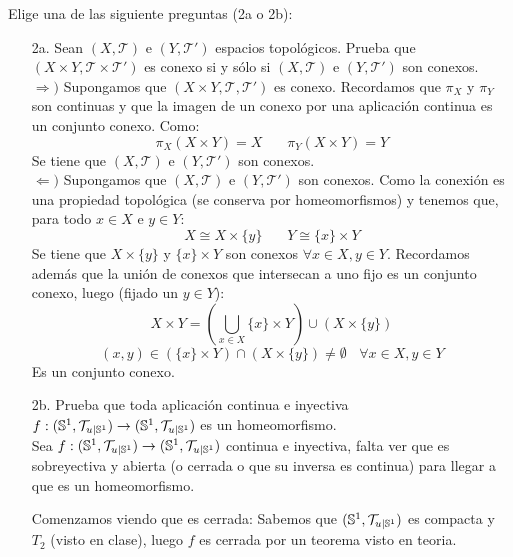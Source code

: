 \documentclass[12pt]{article}
\begin{document}
    \begin{ejercicio}[2.5 puntos]
        Elige una de las siguiente preguntas (2a o 2b):
        \begin{enumerate}
            \item[2a.] Sean $(X, \mathcal{T})$ e $(Y, \mathcal{T}')$ espacios topológicos. Prueba que $(X\times Y, \mathcal{T}\times \mathcal{T}')$ es conexo si y sólo si $(X, \mathcal{T})$ e $(Y, \mathcal{T}')$ son conexos.\\

                \noindent
                $\Rightarrow)$ Supongamos que $(X \times Y, \mathcal{T}, \mathcal{T}')$ es conexo. Recordamos que $\pi_X$ y $\pi_Y$ son continuas y que la imagen de un conexo por una aplicación continua es un conjunto conexo. Como:
                $$\pi_X(X\times Y) = X~~~~~~~~\pi_Y(X \times Y) = Y$$
                Se tiene que $(X, \mathcal{T})$ e $(Y, \mathcal{T}')$ son conexos.\\

                \noindent
                $\Leftarrow)$ Supongamos que $(X, \mathcal{T})$ e $(Y, \mathcal{T}')$ son conexos. Como la conexión es una propiedad topológica (se conserva por homeomorfismos) y tenemos que, para todo $x \in X$ e $y \in Y$:
                $$X \cong X \times \{y\}~~~~~~~~ Y \cong \{x\} \times Y$$
                Se tiene que $X \times \{y\}$ y $\{x\} \times Y$ son conexos $\forall x \in X, y \in Y$.\newline
                Recordamos además que la unión de conexos que intersecan a uno fijo es un conjunto conexo, luego (fijado un $y \in Y$):
                $$X \times Y = \left( \bigcup_{x \in X} \{x\} \times Y\right) \cup (X \times \{y\})$$
                $$ (x,y) \in (\{x\} \times Y) \cap (X \times \{y\}) \neq \emptyset~~~~\forall x \in X, y \in Y$$
                Es un conjunto conexo.
                
            \item[2b.] Prueba que toda aplicación continua e inyectiva $f:(\mathbb{S}^1, \mathcal{T}_{u|\mathbb{S}^1}) \rightarrow (\mathbb{S}^1, \mathcal{T}_{u|\mathbb{S}^1})$ es un homeomorfismo.\\

                \noindent
                Sea $f:(\mathbb{S}^1, \mathcal{T}_{u|\mathbb{S}^1}) \rightarrow (\mathbb{S}^1, \mathcal{T}_{u|\mathbb{S}^1})$ continua e inyectiva, falta ver que es sobreyectiva y abierta (o cerrada o que su inversa es continua) para llegar a que es un homeomorfismo.

                \noindent
                Comenzamos viendo que es cerrada:\newline
                Sabemos que $(\mathbb{S}^1, \mathcal{T}_{u|\mathbb{S}^1})$ es compacta y $T_2$ (visto en clase), luego $f$ es cerrada por un teorema visto en teoria.


\end{enumerate}
\end{ejercicio}
\end{document}
